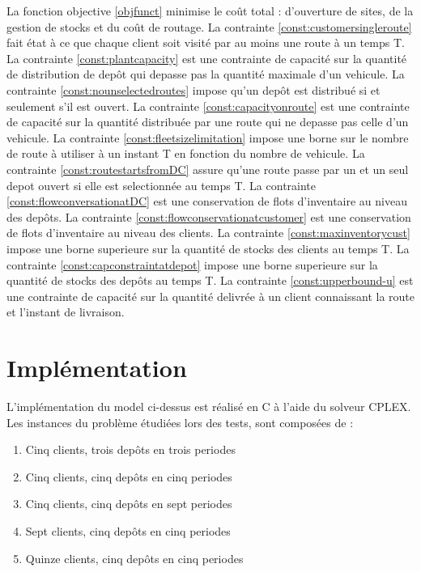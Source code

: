 \documentclass[a4paper,10pt]{article}
\begin{document}
La fonction objective \eqref{objfunct} minimise le coût total : d'ouverture de sites, de la gestion de stocks et du coût de routage.
La contrainte \eqref{const:customersingleroute} fait état à ce que chaque client soit visité par au moins une route à un temps T. 
La contrainte \eqref{const:plantcapacity} est une contrainte de capacité sur la quantité de distribution de depôt qui depasse pas la quantité
maximale d'un vehicule.
La contrainte \eqref{const:nounselectedroutes} impose qu'un depôt est distribué si et seulement s'il est ouvert. 
La contrainte \eqref{const:capacityonroute} est une contrainte de capacité sur la quantité distribuée par une route qui ne depasse pas celle d'un vehicule.
La contrainte \eqref{const:fleetsizelimitation} impose une borne sur le nombre de route à utiliser à un instant T en fonction du nombre de vehicule.
La contrainte \eqref{const:routestartsfromDC} assure qu'une route passe par un et un seul depot ouvert si elle est selectionnée au temps T.
La contrainte \eqref{const:flowconversationatDC} est une conservation de flots d'inventaire au niveau des depôts.
La contrainte \eqref{const:flowconservationatcustomer} est une conservation de flots d'inventaire au niveau des clients. 
La contrainte \eqref{const:maxinventorycust} impose une borne superieure sur la quantité de stocks des clients au temps T.
La contrainte \eqref{const:capconstraintatdepot} impose une borne superieure sur la quantité de stocks des depôts au temps T.
La contrainte \eqref{const:upperbound-u} est une contrainte de capacité sur la quantité delivrée à un client connaissant la route et l'instant de livraison.





\section{Implémentation}
L'implémentation du model ci-dessus est réalisé en C à l'aide du solveur CPLEX. Les instances du problème étudiées lors des tests, sont composées de :
\begin{enumerate}
 \item Cinq clients, trois depôts en trois periodes
 \item Cinq clients, cinq depôts en cinq periodes
 \item Cinq clients, cinq depôts en sept periodes
 \item Sept clients, cinq depôts en cinq periodes
 \item Quinze clients, cinq depôts en cinq periodes
\end{enumerate}
\end{document}
